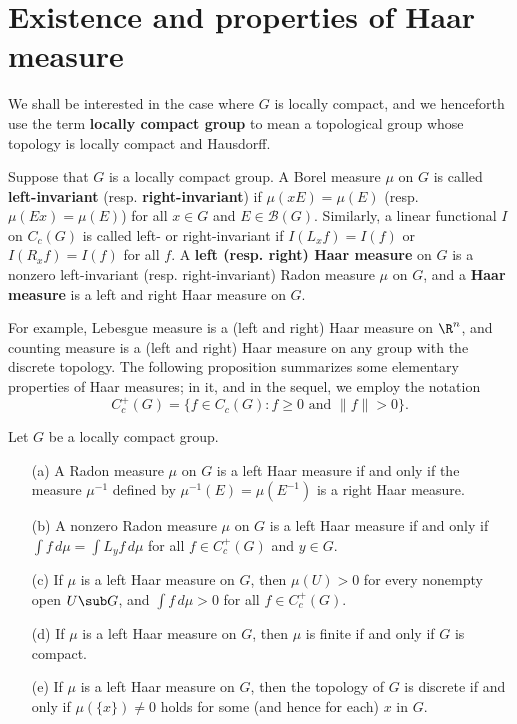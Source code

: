 \section{Existence and properties of Haar measure}
We shall be interested in the case where $G$ is locally compact, and we henceforth use the term \textbf{locally compact group} to mean a topological group whose topology is locally compact and Hausdorff.\par
Suppose that $G$ is a locally compact group. A Borel measure $\mu$ on $G$ is called \textbf{left-invariant} (resp. \textbf{right-invariant}) if $\mu(xE)=\mu(E)$ (resp. $\mu(Ex)=\mu(E)$) for all $x\in G$ and $E\in\mathcal{B}(G)$. Similarly, a linear functional $I$ on $C_c(G)$ is called left- or right-invariant if $I(L_xf)=I(f)$ or $I(R_xf)=I(f)$ for all $f$. A \textbf{left (resp. right) Haar measure} on $G$ is a nonzero left-invariant (resp. right-invariant) Radon measure $\mu$ on $G$, and a \textbf{Haar measure} is a left and right Haar measure on $G$.\par
For example, Lebesgue measure is a (left and right) Haar measure on $\R^n$, and counting measure is a (left and right) Haar measure on any group with the discrete topology. The following proposition summarizes some elementary properties of Haar measures; in it, and in the sequel, we employ the notation
\[C_c^+(G)=\{f\in C_c(G):f\geq 0\text{ and }\|f\|>0\}.\]
\begin{proposition}\label{Haar measure prop}
Let $G$ be a locally compact group.
\begin{itemize}
\item[(a)] A Radon measure $\mu$ on $G$ is a left Haar measure if and only if the measure $\mu^{-1}$ defined by $\mu^{-1}(E)=\mu(E^{-1})$ is a right Haar measure.
\item[(b)] A nonzero Radon measure $\mu$ on $G$ is a left Haar measure if and only if $\int f\,d\mu=\int L_yf\,d\mu$ for all $f\in C_c^+(G)$ and $y\in G$.
\item[(c)] If $\mu$ is a left Haar measure on $G$, then $\mu(U)>0$ for every nonempty open $U\sub G$, and $\int f\,d\mu>0$ for all $f\in C_c^+(G)$.
\item[(d)] If $\mu$ is a left Haar measure on $G$, then $\mu$ is finite if and only if $G$ is compact.
\item[(e)] If $\mu$ is a left Haar measure on $G$, then the topology of $G$ is discrete if and only if $\mu(\{x\})\neq 0$ holds for some (and hence for each) $x$ in $G$.
\end{itemize}
\end{proposition}
